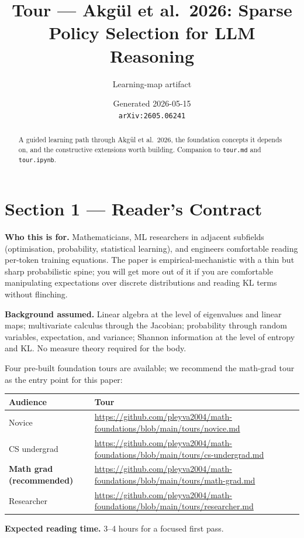\documentclass[11pt]{article}
\title{Tour --- Akg\"ul et al.\ 2026: Sparse Policy Selection for LLM Reasoning}
\author{Learning-map artifact}
\date{Generated 2026-05-15 \\ \texttt{arXiv:2605.06241}}
\begin{document}
\maketitle

\begin{abstract}
A guided learning path through Akg\"ul et al.\ 2026, the foundation concepts it depends on, and the constructive extensions worth building. Companion to \texttt{tour.md} and \texttt{tour.ipynb}.
\end{abstract}

\section*{Section 1 --- Reader's Contract}

\textbf{Who this is for.} Mathematicians, ML researchers in adjacent subfields (optimisation, probability, statistical learning), and engineers comfortable reading per-token training equations. The paper is empirical-mechanistic with a thin but sharp probabilistic spine; you will get more out of it if you are comfortable manipulating expectations over discrete distributions and reading KL terms without flinching.

\textbf{Background assumed.} Linear algebra at the level of eigenvalues and linear maps; multivariate calculus through the Jacobian; probability through random variables, expectation, and variance; Shannon information at the level of entropy and KL. No measure theory required for the body.

Four pre-built foundation tours are available; we recommend the math-grad tour as the entry point for this paper:

\begin{longtable}{@{}ll@{}}
\toprule
Audience & Tour \\
\midrule
Novice & \url{https://github.com/pleyva2004/math-foundations/blob/main/tours/novice.md} \\
CS undergrad & \url{https://github.com/pleyva2004/math-foundations/blob/main/tours/cs-undergrad.md} \\
\textbf{Math grad (recommended)} & \url{https://github.com/pleyva2004/math-foundations/blob/main/tours/math-grad.md} \\
Researcher & \url{https://github.com/pleyva2004/math-foundations/blob/main/tours/researcher.md} \\
\bottomrule
\end{longtable}

\textbf{Expected reading time.} 3--4 hours for a focused first pass.
\end{document}
